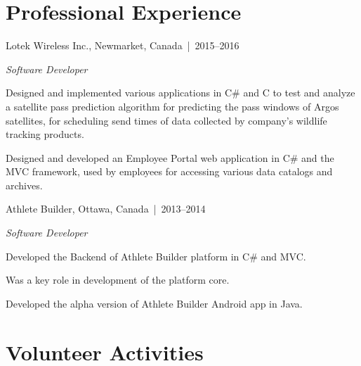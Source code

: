 \documentclass[12pt,letterpaper]{article}
\renewenvironment{itemize}{
  \begin{list}{}{
    \setlength{\leftmargin}{1.5em}
    \setlength{\itemsep}{0.25em}
    \setlength{\parskip}{0pt}
    \setlength{\parsep}{0.25em}
  }
}{
  \end{list}
}
\begin{document}
\section*{Professional Experience}
\begin{itemize}
\item {\large Lotek Wireless Inc., } Newmarket, Canada\, |\, {\small 2015--2016}

  \textit{Software Developer}

  \begin{itemize}
  \item Designed and implemented various applications in C\# and C to test and
    analyze a satellite pass prediction algorithm for predicting the pass
    windows of Argos satellites, for scheduling send times of data collected by
    company's wildlife tracking products.

  \item Designed and developed an Employee Portal web application in C\# and the
    MVC framework, used by employees for accessing various data catalogs and
    archives.
  \end{itemize}
  \vspace{.25em}

\item {\large Athlete Builder, } Ottawa, Canada\, |\, {\small 2013--2014}

  \textit{Software Developer}

  \begin{itemize}
  \item Developed the Backend of Athlete Builder platform in C\# and MVC.
  \item Was a key role in development of the platform core.
  \item Developed the alpha version of Athlete Builder Android app in Java.
  \end{itemize}
\end{itemize}

\section*{Volunteer Activities}
\end{document}
